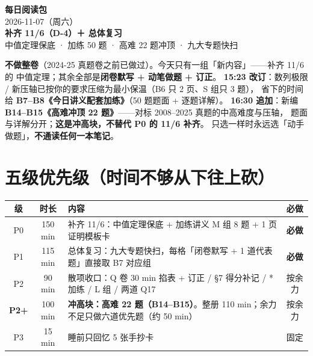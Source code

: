 \documentclass[10pt,a4paper]{ctexart}
\begin{document}
\begin{center}
{\Huge\bfseries 每日阅读包}\\[0.25em]
{\LARGE 2026-11-07（周六）}\\[0.45em]
{\Large\bfseries 补齐 11/6（D-4）＋ 总体复习}\\[0.3em]
{\normalsize 中值定理保底 · 加练 50 题 · 高难 22 题冲顶 · 九大专题快扫}
\end{center}
\vspace{0.4em}
\begin{keypoint}[今天的一句话]
\textbf{不做整卷}（2024-25 真题卷之前已做过）。今天只有一组「新内容」——补齐 11/6 的
中值定理；其余全部是\textbf{闭卷默写 + 动笔做题 + 订正}。
\textbf{15:23 改订}：数列极限 / 新压轴已按你的要求压缩为最小保温（B6 只 2 页、S 组只 3 题），
省下的时间给 \textbf{B7--B8《今日讲义配套加练》}（50 题题面 + 逐题详解）。
\textbf{16:30 追加}：新编 \textbf{B14--B15《高难冲顶 22 题》}——对标 2008--2025 真题的中高难度与压轴，
题面与详解分开；\textbf{这是冲高块，不替代 P0 的 11/6 补齐}。
只选一样时永远选「动手做题」，\textbf{不通读任何一本笔记}。
\end{keypoint}
\section*{五级优先级（时间不够从下往上砍）}
\begin{tabularx}{\linewidth}{c|c|p{8.1cm}|c}
\toprule
级 & 时长 & 内容 & 必做 \\
\midrule
P0 & 150 min & 补齐 11/6：中值定理保底 + 加练讲义 M 组 8 题 + 1 页证明模板卡 & \textbf{必做} \\
P1 & 115 min & 总体复习：九大专题快扫，每格「闭卷默写 + 1 道代表题」直接取 B7 对应组 & \textbf{必做} \\
P2 & 90 min & 散项收口：Q 卷 30 min 掐表 + 订正 / §7 得分补记 / *加练 / L 组 / 两道 Q17 & 按余力 \\
\textbf{P2+} & 100 min & \textbf{冲高块：高难 22 题（B14--B15）}。整册 110 min；余力不足只做六道优先题（约 50 min） & 按余力 \\
P3 & 15 min & 睡前只回忆 5 张手抄卡 & 固定 \\
\bottomrule
\end{tabularx}
\end{document}
